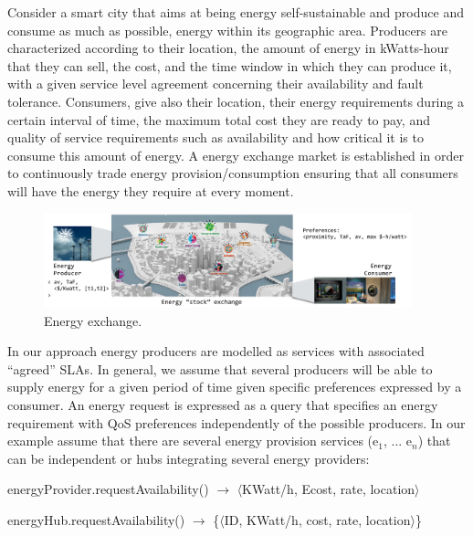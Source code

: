 Consider a smart city that aims at being energy self-sustainable and produce and consume as much as possible, energy within its geographic area. 
Producers are characterized according to their location, the amount of energy in kWatts-hour that they can sell, the cost, and the time window in which they can produce it, with a given service level agreement concerning their availability and fault tolerance. 
Consumers, give also their location, their energy requirements during a certain interval of time, the maximum total cost they are ready to pay, and quality of service requirements such as availability and how critical it is to consume this amount of energy. 
A energy exchange market is established in order to continuously trade  energy provision/consumption ensuring that all consumers will have the energy they require at every moment.

\begin{figure}
\includegraphics[width=0.95\textwidth]{figs/exchange.pdf}
\caption{\label{fig:energyXChange} Energy exchange.}
\end{figure}

In our approach energy producers are modelled as services with associated ``agreed'' SLAs. 
In general, we assume that several producers will be able to supply energy for a given period of time given specific  preferences expressed by a consumer. 
An energy request is expressed as a query that specifies an energy requirement with QoS preferences independently of the possible producers. In our example assume that there are several energy provision services ({\sf e$_1$, ... e$_n$}) that can be independent or hubs integrating several energy providers:
\begin{description}
\sf\footnotesize
\item energyProvider.requestAvailability() $\rightarrow$ $\langle$KWatt/h, Ecost, rate, location$\rangle$

\item energyHub.requestAvailability() $\rightarrow$  \{$\langle$ID, KWatt/h, cost, rate, location$\rangle$\}

\end{description}

